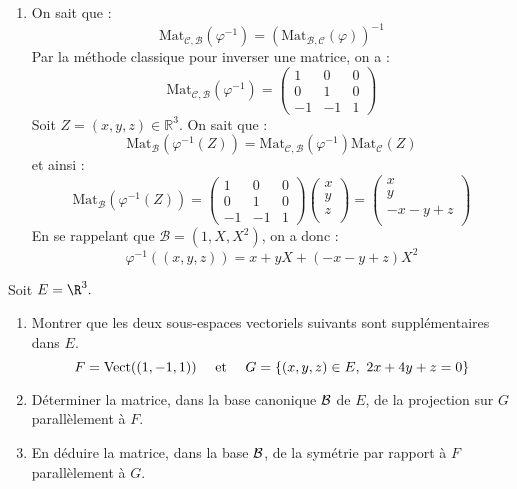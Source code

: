 \documentclass[a4paper,twoside,french,11pt]{VcCours}
\begin{document}
\begin{enumerate}
\item On sait que :
$$ \textrm{Mat}_{\mathcal{C}, \mathcal{B}}(\varphi^{-1}) = (\textrm{Mat}_{\mathcal{B}, \mathcal{C}}(\varphi))^{-1}$$
Par la méthode classique pour inverser une matrice, on a :
$$\textrm{Mat}_{\mathcal{C}, \mathcal{B}}(\varphi^{-1}) = \begin{pmatrix}
1 & 0 & 0 \\
0 & 1 & 0 \\
-1 & -1 & 1 
\end{pmatrix}$$
Soit $Z=(x,y,z) \in \mathbb{R}^3$. On sait que :
$$ \textrm{Mat}_{\mathcal{B}}(\varphi^{-1}(Z)) = \textrm{Mat}_{\mathcal{C}, \mathcal{B}}(\varphi^{-1}) \textrm{Mat}_{\mathcal{C}}(Z)$$
et ainsi :
$$ \textrm{Mat}_{\mathcal{B}}(\varphi^{-1}(Z)) = \begin{pmatrix}
1 & 0 & 0 \\
0 & 1 & 0 \\
-1 & -1 & 1 
\end{pmatrix} \begin{pmatrix}
x \\
y \\
z \\
\end{pmatrix} = \begin{pmatrix}
x \\
y \\
-x-y+z \\
\end{pmatrix}$$
En se rappelant que $\mathcal{B}=(1,X,X^2)$, on a donc :
$$ \varphi^{-1}((x,y,z)) = x + y X + (-x-y+z)X^2$$
\end{enumerate}




\begin{Exercice}{} Soit $E=\R^3.$

\begin{enumerate}

\item Montrer que les deux sous-espaces vectoriels suivants sont
supplémentaires dans $E.$
$$F=\hbox{Vect}((1,-1,1))\quad\hbox{ et }\quad G=\{(x,y,z)\in
E,\ 2x+4y+z=0\}$$

\item Déterminer la matrice, dans la base canonique ${\cal B}$
de $E$, de la projection sur $G$ parallèlement à $F.$

\item En déduire la matrice, dans la base ${\cal B}$, de la
symétrie par rapport \`a $F$ parallèlement à $G.$
\end{enumerate}
\end{Exercice} 
\end{document}
